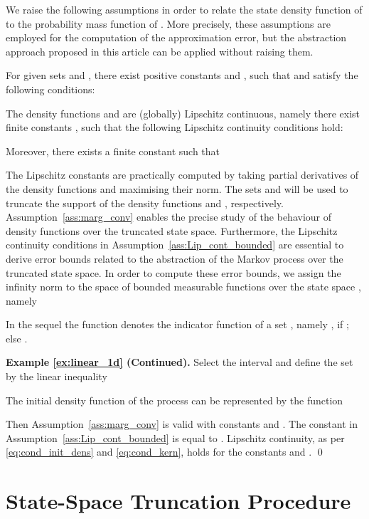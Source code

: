 \documentclass{LMCS}
\begin{document}
We raise the following assumptions in order to
relate the state density function of  to the probability mass function of .
More precisely, 
these assumptions are employed for the computation of the approximation error, 
but the abstraction approach proposed in this article can be applied without raising them.
\begin{asm}
\label{ass:marg_conv}
For given sets  and ,
there exist positive constants  and , such that 
 and  satisfy the following conditions: 

\end{asm}
\begin{asm}
\label{ass:Lip_cont_bounded}
The density functions  and  are (globally) Lipschitz continuous,  
namely there exist finite constants , 
such that the following Lipschitz continuity conditions hold: 

Moreover, there exists a finite constant  such that

\end{asm}
The Lipschitz constants  are practically computed by taking partial derivatives of the density functions  and maximising their norm.
The sets  and  will be used to truncate the support of the density functions 
 and , respectively. 
Assumption~\ref{ass:marg_conv} enables the precise study of the behaviour of density functions 
over the truncated state space. 
Furthermore, 
the Lipschitz continuity conditions in Assumption~\ref{ass:Lip_cont_bounded} are essential to derive error bounds related to the abstraction of the Markov process over the truncated state space. 
In order to compute these error bounds, 
we assign the infinity norm to the space of bounded measurable functions over the state space , namely 
 
In the sequel the function  denotes the indicator function of a set , 
namely , if ; else . 

\medskip

\textbf{Example \ref{ex:linear_1d} (Continued).}
Select the interval  and define the set  by the linear inequality

The initial density function  of the process can be represented by the function 

Then Assumption~\ref{ass:marg_conv} is valid with constants  and .
The constant  in Assumption~\ref{ass:Lip_cont_bounded} is equal to .
Lipschitz continuity, as per \eqref{eq:cond_init_dens} and \eqref{eq:cond_kern},
holds for the constants  and . 
\hfill \qed

\section{State-Space Truncation Procedure}
\label{sec:trunc}
\end{document}
